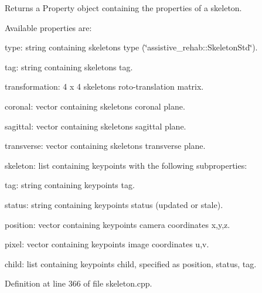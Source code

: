 \begin{DoxyReturn}{Returns}
a Property object containing the properties of a skeleton.
\end{DoxyReturn}
Available properties are\+:
\begin{DoxyItemize}
\item type\+: string containing skeleton\textquotesingle{}s type (\char`\"{}assistive\+\_\+rehab\+::\+Skeleton\+Std\char`\"{}).
\item tag\+: string containing skeleton\textquotesingle{}s tag.
\item transformation\+: 4 x 4 skeleton\textquotesingle{}s roto-\/translation matrix.
\item coronal\+: vector containing skeleton\textquotesingle{}s coronal plane.
\item sagittal\+: vector containing skeleton\textquotesingle{}s sagittal plane.
\item transverse\+: vector containing skeleton\textquotesingle{}s transverse plane.
\item skeleton\+: list containing keypoints with the following subproperties\+:
\begin{DoxyItemize}
\item tag\+: string containing keypoint\textquotesingle{}s tag.
\item status\+: string containing keypoint\textquotesingle{}s status (updated or stale).
\item position\+: vector containing keypoint\textquotesingle{}s camera coordinates x,y,z.
\item pixel\+: vector containing keypoint\textquotesingle{}s image coordinates u,v.
\item child\+: list containing keypoint\textquotesingle{}s child, specified as position, status, tag. 
\end{DoxyItemize}
\end{DoxyItemize}

Definition at line 366 of file skeleton.\+cpp.



